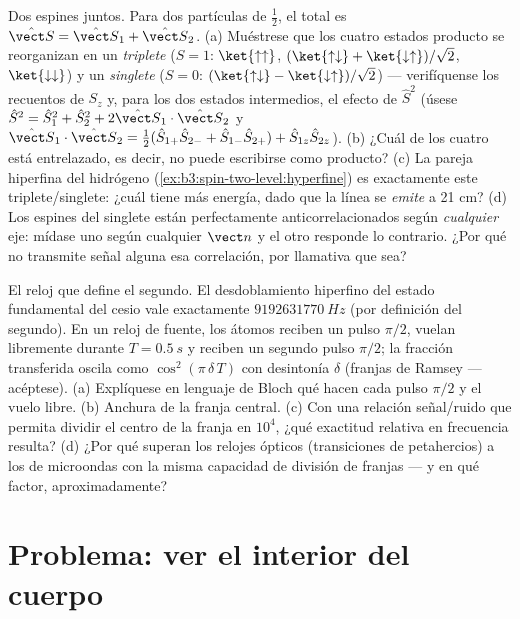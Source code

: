 \begin{exercise}[$\star\star\star$]\label{exo:b3:spin-two-level:11}
Dos espines juntos. Para dos partículas de  $\tfrac12$, el 
total es $\hat{\vect S} = \hat{\vect S}_1 + \hat{\vect S}_2$. (a) Muéstrese
que los cuatro estados producto se reorganizan en un \emph{triplete} ($S = 1$:
$\ket{\uparrow\uparrow}$, $(\ket{\uparrow\downarrow} +
\ket{\downarrow\uparrow})/\sqrt2$, $\ket{\downarrow\downarrow}$)
y un \emph{singlete} ($S = 0$: $(\ket{\uparrow\downarrow} -
\ket{\downarrow\uparrow})/\sqrt2$) --- verifíquense los recuentos de $S_z$ y,
para los dos estados intermedios, el efecto de $\hat S^2$ (úsese $\hat
S^2 = \hat S_1^2 + \hat S_2^2 + 2\hat{\vect S}_1\cdot\hat{\vect
S}_2$ y $\hat{\vect S}_1\cdot\hat{\vect S}_2 = \tfrac12(\hat
S_{1+}\hat S_{2-} + \hat S_{1-}\hat S_{2+}) + \hat S_{1z}\hat
S_{2z}$). (b) ¿Cuál de los cuatro está entrelazado, es decir, no puede
escribirse como producto? (c) La pareja hiperfina del hidrógeno
(\cref{ex:b3:spin-two-level:hyperfine}) es exactamente este
triplete/singlete: ¿cuál tiene más energía, dado que la línea se
\emph{emite} a 21 cm? (d) Los espines del singlete están perfectamente
anticorrelacionados según \emph{cualquier} eje: mídase uno según cualquier
$\vect n$ y el otro responde lo contrario. ¿Por qué no transmite señal
alguna esa correlación, por llamativa que sea?
\end{exercise}

\begin{exercise}[$\star\star\star$]\label{exo:b3:spin-two-level:12}
El reloj que define el segundo. El desdoblamiento hiperfino del estado
fundamental del cesio vale exactamente $\qty{9192631770}{Hz}$ (por
definición del segundo). En un reloj de fuente, los átomos reciben un pulso
$\pi/2$, vuelan libremente durante $T = \qty{0.5}{s}$ y reciben un segundo
pulso $\pi/2$; la fracción transferida oscila como $\cos^2(\pi\,\delta\,T)$
con desintonía $\delta$ (franjas de Ramsey --- acéptese). (a) Explíquese en
lenguaje de Bloch qué hacen cada pulso $\pi/2$ y el vuelo libre. (b)
Anchura de la franja central. (c) Con una relación señal/ruido que permita
dividir el centro de la franja en $10^4$, ¿qué exactitud relativa en
frecuencia resulta? (d) ¿Por qué superan los relojes ópticos (transiciones
de petahercios) a los de microondas con la misma capacidad de división de
franjas --- y en qué factor, aproximadamente?
\end{exercise}

\section{Problema: ver el interior del cuerpo}

